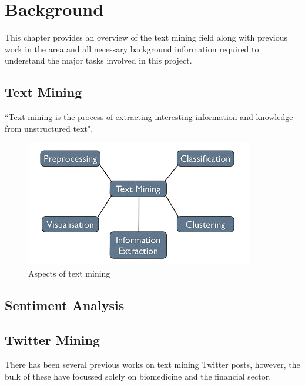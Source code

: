 \chapter{Background}
\label{cha:background}
This chapter provides an overview of the text mining field along with previous work in the area and all necessary background information required to understand the major tasks involved in this project.

\section{Text Mining}
``Text mining is the process of extracting interesting information and knowledge from unstructured text"\cite{hotho-etal-ldv-2005}.
\begin{figure}
\begin{center}
\includegraphics[width=10cm]{textmining}
\end{center}
\caption{Aspects of text mining}
\label{fig:design}  
\end{figure}

\section{Sentiment Analysis}

\section{Twitter Mining}
There has been several previous works on text mining Twitter posts, however, the bulk of these have focussed solely on biomedicine and the financial sector.


